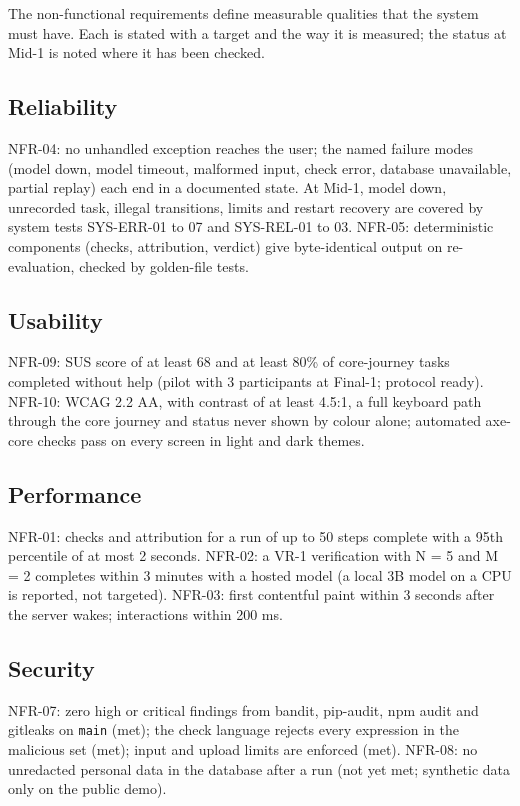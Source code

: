 \documentclass{fast-nuces-bs}
\begin{document}
The non-functional requirements define measurable qualities that the system must have. Each is stated with a target and the way it is measured; the status at Mid-1 is noted where it has been checked.

\subsection{Reliability}

NFR-04: no unhandled exception reaches the user; the named failure modes (model down, model timeout, malformed input, check error, database unavailable, partial replay) each end in a documented state. At Mid-1, model down, unrecorded task, illegal transitions, limits and restart recovery are covered by system tests SYS-ERR-01 to 07 and SYS-REL-01 to 03. NFR-05: deterministic components (checks, attribution, verdict) give byte-identical output on re-evaluation, checked by golden-file tests.

\subsection{Usability}

NFR-09: SUS score of at least 68 and at least 80\% of core-journey tasks completed without help (pilot with 3 participants at Final-1; protocol ready). NFR-10: WCAG 2.2 AA, with contrast of at least 4.5:1, a full keyboard path through the core journey and status never shown by colour alone; automated axe-core checks pass on every screen in light and dark themes.

\subsection{Performance}

NFR-01: checks and attribution for a run of up to 50 steps complete with a 95th percentile of at most 2 seconds. NFR-02: a VR-1 verification with N = 5 and M = 2 completes within 3 minutes with a hosted model (a local 3B model on a CPU is reported, not targeted). NFR-03: first contentful paint within 3 seconds after the server wakes; interactions within 200 ms.

\subsection{Security}

NFR-07: zero high or critical findings from bandit, pip-audit, npm audit and gitleaks on \texttt{main} (met); the check language rejects every expression in the malicious set (met); input and upload limits are enforced (met). NFR-08: no unredacted personal data in the database after a run (not yet met; synthetic data only on the public demo).
\end{document}
